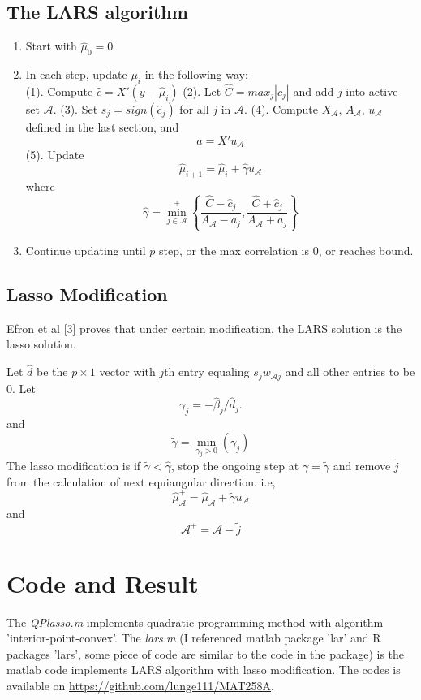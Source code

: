 \documentclass{article} %
\begin{document}
\subsection{The LARS algorithm}
\begin{enumerate}
	\item Start with $\hat{\mu}_0=0$
	\item In each step, update $\mu_i$ in the following way:\\
	(1). Compute $\hat{c}=X'(y-\hat{\mu}_i)$
	(2). Let $\hat{C}=max_j{|\hat{c}_j|}$ and add $j$ into active set $\mathcal{A}$.
	(3). Set $s_j=sign(\hat{c}_j)$ for all $j$ in $\mathcal{A}$.
	(4). Compute $X_\mathcal{A},\,A_\mathcal{A},\,u_\mathcal{A}$ defined in the last section, and \[
	a=X'u_\mathcal{A}
	\]
	(5). Update \[
	\hat{\mu}_{i+1}=\hat{\mu}_i+\hat{\gamma}u_\mathcal{A}
	\]where\[
	\hat{\gamma}=\min^+_{j\in\mathcal{A}}\left\{\frac{\hat{C}-\hat{c}_j}{A_\mathcal{A}-a_j},\frac{\hat{C}+\hat{c}_j}{A_\mathcal{A}+a_j}\right\}
	\]
	\item Continue updating until $p$ step, or the max correlation is 0, or reaches bound.
\end{enumerate}

\subsection{Lasso Modification}
Efron et al [3] proves that under certain modification, the LARS solution is the lasso solution.

Let $\hat{d}$ be the $p\times1$ vector with $j$th entry equaling $s_jw_{\mathcal{A}j}$ and all other entries to be 0. Let \[
\gamma_j=-\hat{\beta}_j/\hat{d}_j.
\] and \[
\tilde{\gamma}=\min_{\gamma_j>0}(\gamma_j)
\]
The lasso modification is if $\tilde{\gamma}<\hat{\gamma}$, stop the ongoing step at $\gamma=\tilde{\gamma}$ and remove $\tilde{j}$ from the calculation of next equiangular direction. i.e,\[
\hat{\mu}_\mathcal{A}^+=\hat{\mu}_\mathcal{A}+\tilde{\gamma}u_\mathcal{A}
\]and\[
\mathcal{A}^+=\mathcal{A}-\tilde{j}
\]
\section{Code and Result}
The \emph{QPlasso.m} implements quadratic programming method with algorithm 'interior-point-convex'. The \emph{lars.m} (I referenced matlab package 'lar' and R packages 'lars', some piece of code are similar to the code in the package) is the matlab code implements LARS algorithm with lasso modification. The codes is available on \url{https://github.com/lunge111/MAT258A}.
\end{document}
